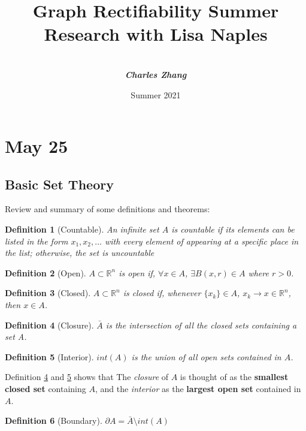 \documentclass[12pt, a4paper]{article}
\title{\textbf{Graph Rectifiability Summer Research with Lisa Naples} \\ [0.5cm] \sffamily{Daily Report}}
\author{\sffamily{By} \\[.2cm] \textbf{\textit{Charles Zhang}}  \\ [.5cm]}
\date{Summer 2021}
\newtheorem{definition}{Definition}[subsection]
\begin{document}
\maketitle

\newpage
{
    \hypersetup{linkcolor=black}
    \tableofcontents
}

\newpage

\section{May 25}
\subsection{Basic Set Theory}

Review and summary of some definitions and theorems:

\begin{definition}[Countable]
    An infinite set $A$ is countable if its elements 
    can be listed in the form $x_1, x_2, ...$ with every 
    element of appearing at a specific place in the list; 
    otherwise, the set is uncountable
\end{definition}

\begin{definition}[Open]
    $A \subset \mathbb{R}^n$ is open if, $\forall x\in A$, $\exists B(x, r)\in A$ where $r>0$.
\end{definition}

\begin{definition}[Closed]
    $A \subset \mathbb{R}^n$ is closed if, whenever $\{x_k\}\in A$, $x_k\rightarrow x \in \mathbb{R}^n$, then $x\in A$.
\end{definition}

\begin{definition}[Closure]\label{closure}
    $\bar{A}$ is the intersection of all the closed sets containing a set A. 
\end{definition}

\begin{definition}[Interior]\label{interior}
    $int(A)$ is the union of all open sets contained in $A$.
\end{definition}

Definition \ref{closure} and \ref{interior} shows that The \textit{closure} 
of $A$ is thought of as the \textbf{smallest closed set} containing $A$, 
and the \textit{interior} as the \textbf{largest open set} contained in $A$.

\begin{definition}[Boundary]
    $\partial A = \bar{A}\setminus int(A)$
\end{definition}
\end{document}
